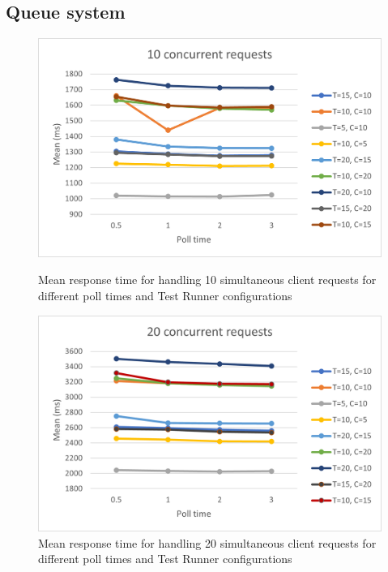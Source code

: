 \subsection{Queue system}
\begin{figure}[!tbp]
  \centering
  \begin{minipage}[t]{0.4\textwidth}
    \includegraphics[scale=0.65]{images/10.png}
    \caption{Mean response time for handling 10 simultaneous client requests for different poll times and Test Runner configurations}
  \end{minipage}
  \hfill
  \begin{minipage}[t]{0.4\textwidth}
    \centering
    \includegraphics[scale=0.65]{images/20.png}
    \caption{Mean response time for handling 20 simultaneous client requests for different poll times and Test Runner configurations}
  \end{minipage}
  \begin{minipage}[t]{0.4\textwidth}
    \centering

\end{minipage}
\end{figure}
